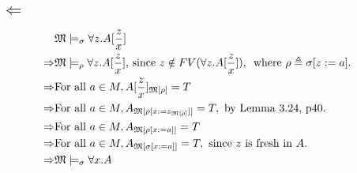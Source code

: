 \documentclass{article}
\begin{document}
\subsection*{$\Leftarrow$}
\begin{align*}
	 &\frak{M} \models _\sigma\forall z. A[\frac{z}{x}]\\
	\Rightarrow &\frak{M} \models _\rho\forall z. A[\frac{z}{x}] \text{, since $z \notin FV(\forall z. A[\frac{z}{x}])$, }\text{ where $\rho \triangleq \sigma[z:=a]$. } \\
	\Rightarrow & \text{For all }a \in M, A[\frac{z}{x}]_{\frak{M} [\rho]} = T \\
	\Rightarrow & \text{For all }a \in M, A_{\frak{M} [\rho[x := z_{\frak{M} [\rho]}]]} = T, \text{ by Lemma 3.24, p40. } \\
	\Rightarrow & \text{For all }a \in M, A_{\frak{M} [\rho[x:=a]]} = T \\
	\Rightarrow & \text{For all }a \in M, A_{\frak{M}[\sigma[x:=a]]} = T, \text{ since $z$ is fresh in $A$. } \\
	\Rightarrow & \frak{M} \models _\sigma \forall x. A
\end{align*}
\end{document}
